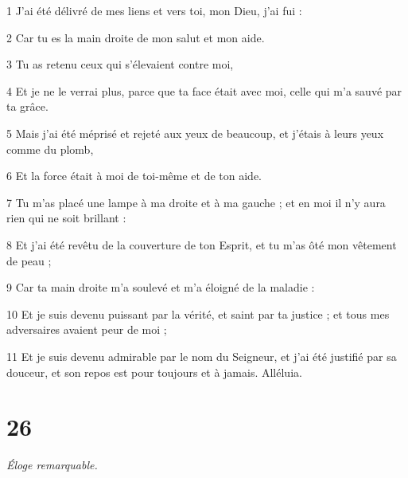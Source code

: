 \par 1 J'ai été délivré de mes liens et vers toi, mon Dieu, j'ai fui :
\par 2 Car tu es la main droite de mon salut et mon aide.
\par 3 Tu as retenu ceux qui s'élevaient contre moi,
\par 4 Et je ne le verrai plus, parce que ta face était avec moi, celle qui m'a sauvé par ta grâce.
\par 5 Mais j'ai été méprisé et rejeté aux yeux de beaucoup, et j'étais à leurs yeux comme du plomb,
\par 6 Et la force était à moi de toi-même et de ton aide.
\par 7 Tu m'as placé une lampe à ma droite et à ma gauche ; et en moi il n'y aura rien qui ne soit brillant :
\par 8 Et j'ai été revêtu de la couverture de ton Esprit, et tu m'as ôté mon vêtement de peau ;
\par 9 Car ta main droite m'a soulevé et m'a éloigné de la maladie :
\par 10 Et je suis devenu puissant par la vérité, et saint par ta justice ; et tous mes adversaires avaient peur de moi ;
\par 11 Et je suis devenu admirable par le nom du Seigneur, et j'ai été justifié par sa douceur, et son repos est pour toujours et à jamais. Alléluia.

\chapter{26}

\par \textit{Éloge remarquable.}

